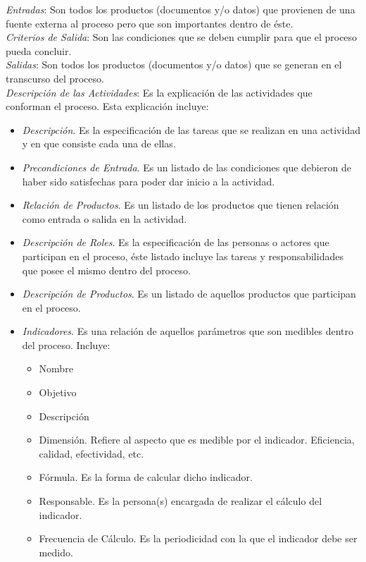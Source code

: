 \begin{footnotesize}
\textit{Entradas}: Son todos los productos (documentos y/o datos) que provienen de una fuente externa al proceso pero que son importantes dentro de éste.\\

\textit{Criterios de Salida}: Son las condiciones que se deben cumplir para que el proceso pueda concluir.\\

\textit{Salidas}: Son todos los productos (documentos y/o datos) que se generan en el transcurso del proceso.\\

\textit{Descripción de las Actividades}: Es la explicación de las actividades que conforman el proceso. Esta explicación incluye:\\

\begin{itemize}
\item \textit{Descripción}. Es la especificación de las tareas que se realizan en una actividad y en que consiste cada una de ellas.\\ 
\item \textit{Precondiciones de Entrada}. Es un listado de las condiciones que debieron de haber sido satisfechas para poder dar inicio a la actividad.\\
\item \textit{Relación de Productos}. Es un listado de los productos que tienen relación como entrada o salida en la actividad.\\
\item \textit{Descripción de Roles}. Es la especificación de las personas o actores que participan en el proceso, éste listado incluye las tareas y responsabilidades que posee el mismo dentro del proceso.\\
\item \textit{Descripción de Productos}. Es un listado de aquellos productos que participan en el proceso.\\
\item \textit{Indicadores}. Es una relación de aquellos parámetros que son medibles dentro del proceso. Incluye:\\

	\begin{itemize}
		\item Nombre
		\item Objetivo
		\item Descripción
		\item Dimensión. Refiere al aspecto que es medible por el indicador. Eficiencia, calidad, efectividad, etc.
		\item Fórmula. Es la forma de calcular dicho indicador.
		\item Responsable. Es la persona(s) encargada de realizar el cálculo del indicador.
		\item Frecuencia de Cálculo. Es la periodicidad con la que el indicador debe ser medido.
	\end{itemize}


\end{itemize}
\end{footnotesize}
